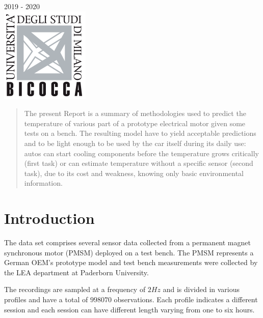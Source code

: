 \begin{titlepage}
{\large 2019 - 2020}\\[1cm] %


\includegraphics{imgs/logo.png}\\[1cm] %
 

\vfill %

\end{titlepage}


\begin{abstract}
  The present Report is a summary of methodologies used to predict the temperature of various part of a prototype electrical motor given some tests on a bench. The resulting model have to yield acceptable predictions and to be light enough to be used by the car itself during its daily use: autos can start cooling components before the temperature grows critically (first task) or can estimate temperature without a specific sensor (second task), due to its cost and weakness, knowing only basic environmental information.
\end{abstract}

\section{Introduction}
The data set comprises several sensor data collected from a permanent magnet synchronous motor (PMSM) deployed on a test bench. The PMSM represents a German OEM's prototype model and test bench measurements were collected by the LEA department at Paderborn University.

The recordings are sampled at a frequency of $2Hz$ and is divided in various profiles and have a total of $998070$ observations. Each profile indicates a different session and each session can have different length varying from one to six hours.

